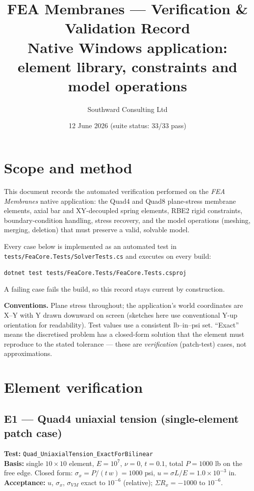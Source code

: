 \documentclass[11pt,a4paper]{article}
\title{\textbf{FEA Membranes --- Verification \& Validation Record}\\
\large Native Windows application: element library, constraints and model operations}
\author{Southward Consulting Ltd}
\date{12 June 2026 \quad (suite status: 33/33 pass)}
\begin{document}
\maketitle

\section*{Scope and method}

This document records the automated verification performed on the
\emph{FEA Membranes} native application: the Quad4 and Quad8 plane-stress
membrane elements, axial bar and XY-decoupled spring elements, RBE2 rigid
constraints, boundary-condition handling, stress recovery, and the model
operations (meshing, merging, deletion) that must preserve a valid, solvable
model.

Every case below is implemented as an automated test in
\texttt{tests/FeaCore.Tests/SolverTests.cs} and executes on every build:
\begin{center}
\texttt{dotnet test tests/FeaCore.Tests/FeaCore.Tests.csproj}
\end{center}
A failing case fails the build, so this record stays current by construction.

\textbf{Conventions.} Plane stress throughout; the application's world
coordinates are X--Y with Y drawn downward on screen (sketches here use
conventional Y-up orientation for readability). Test values use a consistent
lb--in--psi set. ``Exact'' means the discretised problem has a closed-form
solution that the element must reproduce to the stated tolerance --- these are
\emph{verification} (patch-test) cases, not approximations.

\tableofcontents

\section{Element verification}

\subsection{E1 --- Quad4 uniaxial tension (single-element patch case)}
\textbf{Test:} \texttt{Quad\_UniaxialTension\_ExactForBilinear}\\
\textbf{Basis:} single $10\times10$ element, $E=10^7$, $\nu=0$, $t=0.1$,
total $P=1000$ lb on the free edge. Closed form:
$\sigma_x = P/(t\,w) = 1000$ psi, $u = \sigma L/E = 1.0\times10^{-3}$ in.\\
\textbf{Acceptance:} $u$, $\sigma_x$, $\sigma_{VM}$ exact to $10^{-6}$
(relative); $\Sigma R_x = -1000$ to $10^{-6}$.
\end{document}
